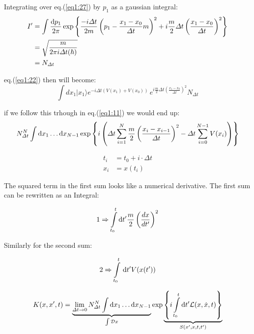 \documentclass[12pt,a4paper]{article}
\newcommand{\ket}[1]{{ |#1 \rangle}}
\numberwithin{equation}{section}
\begin{document}
Integrating over eq.(\ref{eq1:27}) by $p_1$ as a gaussian integral:
\begin{align}
I^\prime &= \int \frac{{\rm{d}} p_1 }{2\pi} \exp\left\lbrace \frac{-i\Delta t }{2m} \left( p_1 - \frac{x_1 - x_0}{\Delta t} m \right)^2 + i\frac{m}{2} \Delta t \left( \frac{x_1 - x_0}{\Delta t}\right)^2 \right\rbrace \\
&= \sqrt{\frac{m}{2 \pi i \Delta t(\hbar)}}\\
&= N_{\Delta t} \\
\end{align}

eq.(\ref{eq1:22}) then will become:
\begin{equation}
\int dx_1 \ket{x_1} e^{-i \Delta t (V(x_1) + V(x_0))}\, e^{i\frac{m}{2} \Delta t \left( \frac{x_1 - x_0}{\Delta t}\right)^2} N_{\Delta t}
\end{equation}

if we follow this trhough in eq.(\ref{eq1:11}) we would end up:
\begin{equation}
N_{\Delta t}^N \int {\rm{d}}x_1 \dots {\rm{d}}x_{N-1} \exp\left\lbrace i \left( {\Delta t \sum\limits_{i=1}^N \frac{m}{2} \left( \frac{x_i - x_{i-1}}{\Delta t} \right)^2} - \Delta t \sum\limits_{i=0}^{N-1} V(x_i)\right) \right\rbrace
\end{equation}

\begin{align*}
t_i &= t_0 + i\cdot \Delta t \\
x_i &= x(t_i)
\end{align*}

The squared term in the first sum looks like a numerical derivative. The first sum can be rewritten as an Integral:

\begin{equation}
1 \Rightarrow \int\limits_{t_0}^{t} {\rm{d}} t^\prime \frac{m}{2} \left( \frac{dx}{dt^\prime} \right)^2
\end{equation}

Similarly for the second sum:

\begin{equation}
2 \Rightarrow \int\limits_{t_0}^{t}\, {\rm{d}} t^\prime V(x(t^\prime))
\end{equation}

\begin{equation}
K(x,x^\prime,t) = \underbrace{\lim_{\Delta t \rightarrow 0} N_{\Delta t}^N \int {\rm{d}}x_1 \dots {\rm{d}} x_{N-1}}_{\int \mathcal{D}x} \exp \underbrace{ \left\lbrace i \int\limits_{t_0}^t {\rm{d}}t^\prime \mathcal{L}(x,\dot{x},t)\right\rbrace}_{S(x^\prime,x,t,t^\prime)} 
\end{equation}
\end{document}
